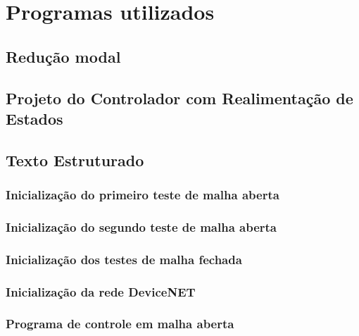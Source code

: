


\chapter{Programas utilizados}

\section{Redução modal}
\label {reducaoModalPrograma}


\section{Projeto do Controlador com Realimentação de Estados}
\label{projetoControlador}


\section{Texto Estruturado}
\label {stsection}

\subsection{Inicialização do primeiro teste de malha aberta}
\label {stMAinit1}


\subsection{Inicialização do segundo teste de malha aberta}
\label {stMAinit2}


\subsection{Inicialização dos testes de malha fechada}
\label {stMFinit}


\subsection{Inicialização da rede DeviceNET}
\label{dninitST}


\subsection{Programa de controle em malha aberta}
\label{maprogST}


